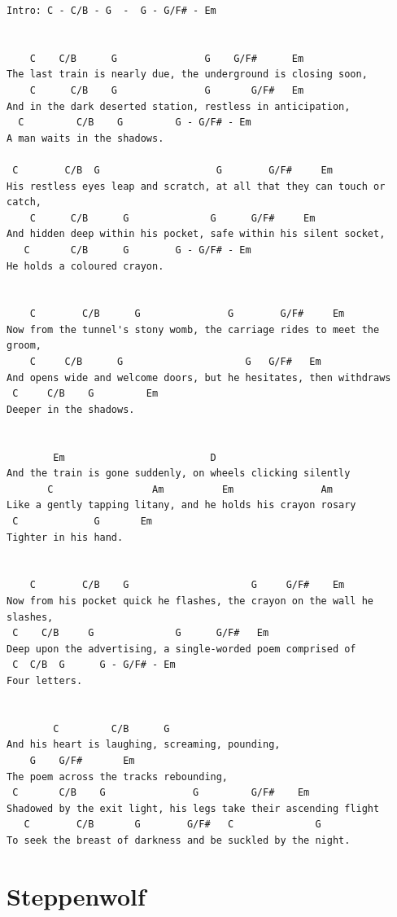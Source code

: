 \documentclass[a4paper]{article}
\begin{document}
\begin{Verbatim}[commandchars=\\\{\}]
Intro: C - C/B - G  -  G - G/F# - Em


    C    C/B      G               G    G/F#      Em
The last train is nearly due, the underground is closing soon,
    C      C/B    G               G       G/F#   Em
And in the dark deserted station, restless in anticipation,
  C         C/B    G         G - G/F# - Em
A man waits in the shadows.

 C        C/B  G                    G        G/F#     Em
His restless eyes leap and scratch, at all that they can touch or catch,
    C      C/B      G              G      G/F#     Em
And hidden deep within his pocket, safe within his silent socket,
   C       C/B      G        G - G/F# - Em
He holds a coloured crayon.


    C        C/B      G               G        G/F#     Em
Now from the tunnel's stony womb, the carriage rides to meet the groom,
    C     C/B      G                     G   G/F#   Em
And opens wide and welcome doors, but he hesitates, then withdraws
 C     C/B    G         Em
Deeper in the shadows.


        Em                         D
And the train is gone suddenly, on wheels clicking silently
       C                 Am          Em               Am
Like a gently tapping litany, and he holds his crayon rosary
 C             G       Em
Tighter in his hand.


    C        C/B    G                     G     G/F#    Em
Now from his pocket quick he flashes, the crayon on the wall he slashes,
 C    C/B     G              G      G/F#   Em
Deep upon the advertising, a single-worded poem comprised of
 C  C/B  G      G - G/F# - Em
Four letters.


        C         C/B      G       
And his heart is laughing, screaming, pounding, 
    G    G/F#       Em
The poem across the tracks rebounding,
 C       C/B    G               G         G/F#    Em
Shadowed by the exit light, his legs take their ascending flight
   C        C/B       G        G/F#   C              G
To seek the breast of darkness and be suckled by the night.
\end{Verbatim}
\newpage
\section{Steppenwolf} %
\label{sec:Steppenwolf}
\end{document}

